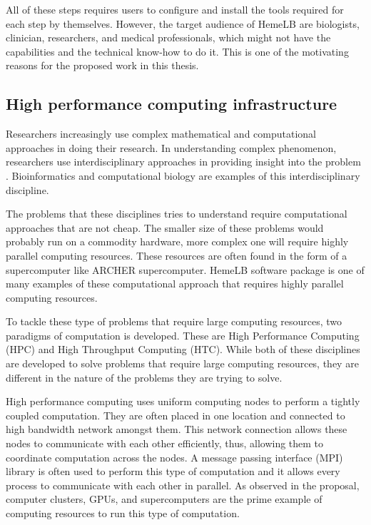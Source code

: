 All of these steps requires users to configure and install the tools required for each step by themselves. However, the target audience of HemeLB are biologists, clinician, researchers, and medical professionals, which might not have the capabilities and the technical know-how to do it. This is one of the motivating reasons for the proposed work in this thesis.


\subsection{High performance computing infrastructure}

Researchers increasingly use complex mathematical and computational approaches in doing their research. In understanding complex phenomenon, researchers use interdisciplinary approaches in providing insight into the problem \citep{huerta2000nih}. Bioinformatics and computational biology are examples of this interdisciplinary discipline. 

The problems that these disciplines tries to understand require computational approaches that are not cheap. The smaller size of these problems would probably run on a commodity hardware, more complex one will require highly parallel computing resources. These resources are often found in the form of a supercomputer like ARCHER supercomputer. HemeLB software package is one of many examples of these computational approach that requires highly parallel computing resources.
 

%

To tackle these type of problems that require large computing resources, two paradigms of computation is developed. These are High Performance Computing (HPC) and High Throughput Computing (HTC).   While both of these disciplines are developed to solve problems that require large computing resources, they are different in the nature of the problems they are trying to solve.

High performance computing uses  uniform  computing nodes to perform a  tightly coupled computation. They are often placed in one location and connected to high bandwidth network amongst them. This network connection allows these nodes to communicate with each other efficiently, thus, allowing them to coordinate computation across the nodes\citep{Micro31:online}. A message passing interface (MPI) library is often used to perform this type of computation and it allows every process to communicate with each other in parallel. As observed in the proposal, computer clusters, GPUs, and supercomputers are the prime example of computing resources to run this type of computation.

